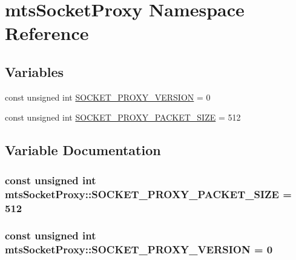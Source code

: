 \hypertarget{namespacemts_socket_proxy}{\section{mts\-Socket\-Proxy Namespace Reference}
\label{namespacemts_socket_proxy}
}
\subsection*{Variables}
\begin{DoxyCompactItemize}
\item 
const unsigned int \hyperlink{namespacemts_socket_proxy_a53385561dff5ae4e824796d56edfbf8d}{S\-O\-C\-K\-E\-T\-\_\-\-P\-R\-O\-X\-Y\-\_\-\-V\-E\-R\-S\-I\-O\-N} = 0
\item 
const unsigned int \hyperlink{namespacemts_socket_proxy_a9817b972f85fbc28120e968dd7f50790}{S\-O\-C\-K\-E\-T\-\_\-\-P\-R\-O\-X\-Y\-\_\-\-P\-A\-C\-K\-E\-T\-\_\-\-S\-I\-Z\-E} = 512
\end{DoxyCompactItemize}


\subsection{Variable Documentation}
\hypertarget{namespacemts_socket_proxy_a9817b972f85fbc28120e968dd7f50790}{
\subsubsection[{S\-O\-C\-K\-E\-T\-\_\-\-P\-R\-O\-X\-Y\-\_\-\-P\-A\-C\-K\-E\-T\-\_\-\-S\-I\-Z\-E}]{\setlength{\rightskip}{0pt plus 5cm}const unsigned int mts\-Socket\-Proxy\-::\-S\-O\-C\-K\-E\-T\-\_\-\-P\-R\-O\-X\-Y\-\_\-\-P\-A\-C\-K\-E\-T\-\_\-\-S\-I\-Z\-E = 512}}\label{namespacemts_socket_proxy_a9817b972f85fbc28120e968dd7f50790}
\hypertarget{namespacemts_socket_proxy_a53385561dff5ae4e824796d56edfbf8d}{
\subsubsection[{S\-O\-C\-K\-E\-T\-\_\-\-P\-R\-O\-X\-Y\-\_\-\-V\-E\-R\-S\-I\-O\-N}]{\setlength{\rightskip}{0pt plus 5cm}const unsigned int mts\-Socket\-Proxy\-::\-S\-O\-C\-K\-E\-T\-\_\-\-P\-R\-O\-X\-Y\-\_\-\-V\-E\-R\-S\-I\-O\-N = 0}}\label{namespacemts_socket_proxy_a53385561dff5ae4e824796d56edfbf8d}

